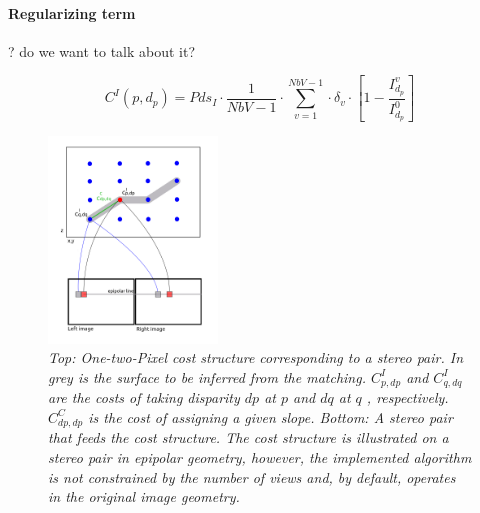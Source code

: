 \documentclass[journal]{IEEEtran}
\newcommand{\er}[1]{\textcolor{er}{#1}}
\begin{document}
\paragraph{Regularizing term}
? \er{do we want to talk about it?}
%
%
\begin{figure}[H]
\begin{equation}\label{eq:cost}
C^I(p,d_p) = Pds_{I} \cdot \frac{1}{NbV-1} \cdot \sum_{v=1}^{NbV-1} \cdot \delta_v \cdot \left[ 1 - \frac{I_{d_p}^v}{I_{d_p}^0} \right]
\end{equation}
\end{figure}
%
\begin{figure}[h]
\centering
\includegraphics[width=0.4\textwidth]{cost_12Pix-2-v5.png} \caption{\textit{Top: One-two-Pixel cost structure corresponding to a stereo pair. In grey is the surface to be inferred from the matching. $C^I_{p,dp}$ and $C^I_{q,dq}$ are the costs of taking disparity $dp$ at $p$ and $dq$ at $q$ , respectively. $C^C_{dp,dp}$ is the cost of assigning a given slope. Bottom: A stereo pair that feeds the cost structure. The cost structure is illustrated on a stereo pair in epipolar geometry, however, the implemented algorithm is not constrained by the number of views and, by default, operates in the original image geometry.}}\label{fig:costCubeStereo}
\end{figure}
% 
\end{document}
